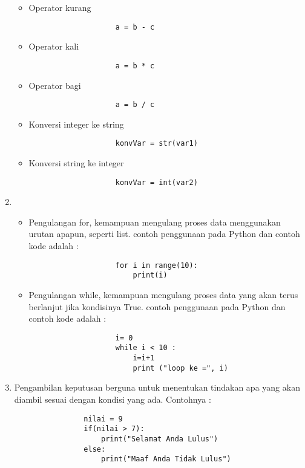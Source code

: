 \begin{enumerate}
\begin{itemize}
					\item Operator kurang
					\begin{lstlisting}
					a = b - c
					\end{lstlisting}

					\item Operator kali
					\begin{lstlisting}
					a = b * c
					\end{lstlisting}

					\item Operator bagi
					\begin{lstlisting}
					a = b / c
					\end{lstlisting}

					\item Konversi integer ke string
					\begin{lstlisting}
					konvVar = str(var1)
					\end{lstlisting}

					\item Konversi string ke integer
					\begin{lstlisting}
					konvVar = int(var2)
					\end{lstlisting}
				\end{itemize}

			\item \begin{itemize}
				\item Pengulangan for, kemampuan mengulang proses data menggunakan urutan apapun, seperti list.
				contoh penggunaan pada Python dan contoh kode adalah :

					\begin{lstlisting}
					for i in range(10):
						print(i)
					\end{lstlisting}
					
				\item Pengulangan while, kemampuan mengulang proses data yang akan terus berlanjut jika kondisinya True.
				contoh penggunaan pada Python dan contoh kode adalah :
					\begin{lstlisting}
					i= 0
					while i < 10 :
						i=i+1
						print ("loop ke =", i)
					\end{lstlisting}
				\end{itemize}
				
			\item Pengambilan keputusan berguna untuk menentukan tindakan apa yang akan diambil sesuai dengan kondisi yang ada. Contohnya :
				\begin{lstlisting}
				nilai = 9
				if(nilai > 7):
					print("Selamat Anda Lulus")
				else:
					print("Maaf Anda Tidak Lulus")
				\end{lstlisting}
				

\end{enumerate}
